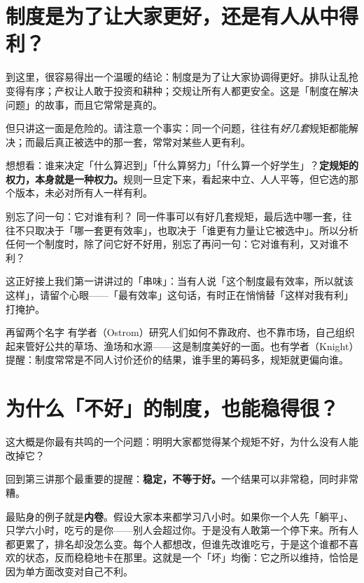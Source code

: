 \documentclass[10pt,a4paper]{ctexart}
\begin{document}
\section{制度是为了让大家更好，还是有人从中得利？}

到这里，很容易得出一个温暖的结论：制度是为了让大家协调得更好。排队让乱抢变得有序；产权让人敢于投资和耕种；交规让所有人都更安全。这是「制度在解决问题」的故事，而且它常常是真的。

但只讲这一面是危险的。请注意一个事实：同一个问题，往往有\emph{好几套}规矩都能解决；而最后真正被选中的那一套，常常对某些人更有利。

想想看：谁来决定「什么算迟到」「什么算努力」「什么算一个好学生」？\textbf{定规矩的权力，本身就是一种权力。}规则一旦定下来，看起来中立、人人平等，但它选的那个版本，未必对所有人一样有利。

\begin{insightbox}{别忘了问一句：它对谁有利？}
同一件事可以有好几套规矩，最后选中哪一套，往往不只取决于「哪一套更有效率」，也取决于「谁更有力量让它被选中」。所以分析任何一个制度时，除了问它好不好用，别忘了再问一句：它对谁有利，又对谁不利？
\end{insightbox}

这正好接上我们第一讲讲过的「串味」：当有人说「这个制度最有效率，所以就该这样」，请留个心眼——「最有效率」这句话，有时正在悄悄替「这样对我有利」打掩护。

\begin{notebox}{再留两个名字}
有学者（Ostrom）研究人们如何不靠政府、也不靠市场，自己组织起来管好公共的草场、渔场和水源——这是制度美好的一面。也有学者（Knight）提醒：制度常常是不同人讨价还价的结果，谁手里的筹码多，规矩就更偏向谁。
\end{notebox}

\section{为什么「不好」的制度，也能稳得很？}

这大概是你最有共鸣的一个问题：明明大家都觉得某个规矩不好，为什么没有人能改掉它？

回到第三讲那个最重要的提醒：\textbf{稳定，不等于好。}一个结果可以非常稳，同时非常糟。

最贴身的例子就是\textbf{内卷}。假设大家本来都学习八小时。如果你一个人先「躺平」、只学六小时，吃亏的是你——别人会超过你。于是没有人敢第一个停下来。所有人都更累了，排名却没怎么变。每个人都想改，但谁先改谁吃亏，于是这个谁都不喜欢的状态，反而稳稳地卡在那里。这就是一个「坏」均衡：它之所以维持，恰恰是因为单方面改变对自己不利。
\end{document}
